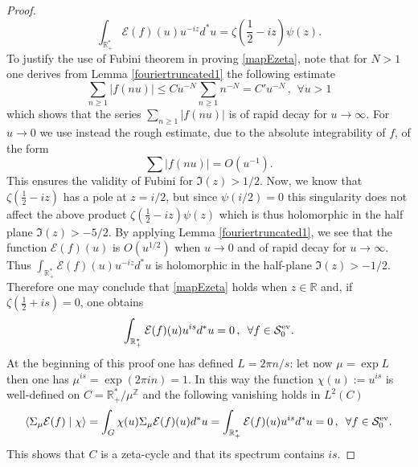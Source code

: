 \documentclass[cupthm]{CUP-JNL-JMJ}
\def\R{{\mathbb R}}
\def\Z{{\mathbb Z}}
\def\cE{{\mathcal E}}
\def\cS{{\mathcal S}}
\def\qqq{\,,\,~\forall}
\def\sr0{{\cS^{\rm ev}_0}}
\numberwithin{equation}{section}
\theoremstyle{cupplain}
\theoremstyle{cupdefinition}
\theoremstyle{cupremark}
\theoremstyle{cupproof}
\newtheorem{proof}{Proof}
\begin{document}
\begin{proof}
\begin{equation}
	\int_{\R_+^*}\cE(f)(u)u^{-iz}d^*u=\zeta(\frac 12-iz)\psi(z).
\end{equation}
To justify the use of Fubini theorem in proving \eqref{mapEzeta},  note that for $N>1$ one derives from Lemma \ref{fouriertruncated1} the following estimate 
$$
\sum_{n\geq 1} \vert f(nu)\vert \leq Cu^{-N}\sum_{n\geq 1}n^{-N}=C'u^{-N}\qqq u>1
$$ 
which shows that the series $\sum_{n\geq 1} \vert f(nu)\vert$ is of rapid decay for $u\to \infty$. For $u\to 0$ 
we use instead the rough estimate, due to the absolute integrability of $f$, of the form 
$$
\sum \vert f(nu)\vert =O(u^{-1}).
$$
This ensures  the validity of Fubini for $\Im(z)>1/2$. Now, we know that $\zeta(\frac 12-iz)$ has a pole at $z=i/2$, but since $\psi(i/2)=0$ this singularity does not affect the above  product $\zeta(\frac 12-iz)\psi(z)$ which is thus holomorphic in the half plane  $\Im(z)>-5/2$. By applying Lemma \ref{fouriertruncated1}, we see that the function $\cE(f)(u)$  is 
$O(u^{1/2})$ when $u\to 0$ and of rapid decay for $u\to\infty$. Thus $\int_{\R_+^*}\cE(f)(u)u^{-iz}d^*u$ is holomorphic in the half-plane $\Im(z)>-1/2$. Therefore one may conclude that \eqref{mapEzeta} holds when $z\in \R$ and,  if $\zeta(\frac 12+is)=0$, one  obtains 
$$
\int_{\R_+^*}\cE(f)(u)u^{is}d^*u=0\qqq f\in \sr0.
$$
At the beginning of this proof one has defined $L=2\pi n/s$: let now $\mu=\exp L$ then one has $\mu^{is}=\exp(2\pi i n)=1$.  In this way the function $\chi(u):=u^{is}$ is well-defined on $C=\R_+^*/\mu^{\Z}$ and the following vanishing holds in $L^2({C})$
$$
\langle \Sigma_\mu\cE(f)\mid \chi\rangle= \int_G \chi(u)\Sigma_\mu \cE(f)(u)d^*u=\int_{\R_+^*}\cE(f)(u)u^{is}d^*u=0\qqq f\in \sr0.
$$
This shows that ${C}$ is a zeta-cycle and that its spectrum contains $is$.\end{proof}
\end{document}
